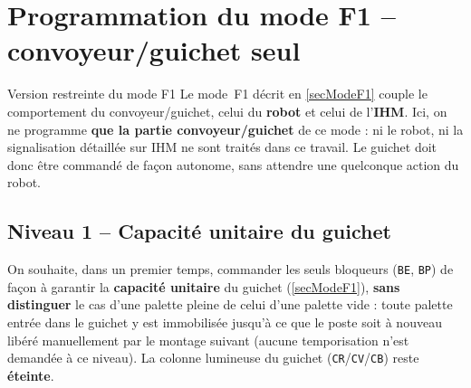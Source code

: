\section{Programmation du mode F1 -- convoyeur/guichet seul}
\label{secModeF1Restreint}

\begin{UPSTIwarning}{Version restreinte du mode F1}
Le mode~F1 décrit en \ref{secModeF1} couple le comportement du
convoyeur/guichet, celui du \textbf{robot} et celui de l'\textbf{IHM}. Ici,
on ne programme \textbf{que la partie convoyeur/guichet} de ce mode : ni le
robot, ni la signalisation détaillée sur IHM ne sont traités dans ce
travail. Le guichet doit donc être commandé de façon autonome, sans
attendre une quelconque action du robot.
\end{UPSTIwarning}


\subsection{Niveau 1 -- Capacité unitaire du guichet}

\begin{UPSTIPreparation}
On souhaite, dans un premier temps, commander les seuls bloqueurs
(\texttt{BE}, \texttt{BP}) de façon à garantir la \textbf{capacité
unitaire} du guichet (\ref{secModeF1}), \textbf{sans distinguer} le cas
d'une palette pleine de celui d'une palette vide : toute palette entrée
dans le guichet y est immobilisée jusqu'à ce que le poste soit à nouveau
libéré manuellement par le montage suivant (aucune temporisation n'est
demandée à ce niveau). La colonne lumineuse du guichet
(\texttt{CR}/\texttt{CV}/\texttt{CB}) reste \textbf{éteinte}.


\end{UPSTIPreparation}




